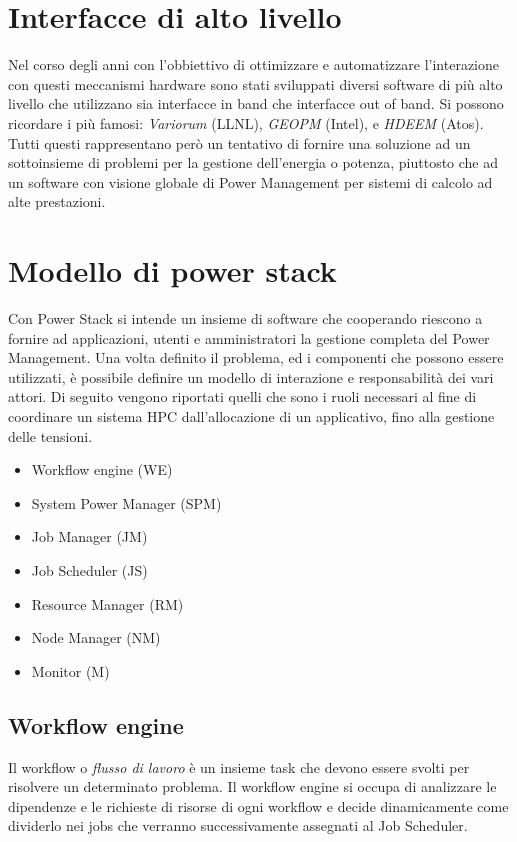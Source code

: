 \section{Interfacce di alto livello}
Nel corso degli anni con l'obbiettivo di ottimizzare e automatizzare l'interazione con questi meccanismi hardware sono stati sviluppati diversi software di più alto livello che utilizzano sia interfacce in band che interfacce out of band. Si possono ricordare i più famosi: \emph{Variorum} (LLNL), \emph{GEOPM} (Intel)\cite{GEOPM}, e \emph{HDEEM} (Atos)\cite{HDEEM}. Tutti questi rappresentano però un tentativo di fornire una soluzione ad un sottoinsieme di problemi per la gestione dell'energia o potenza, piuttosto che ad un software con visione globale di Power Management per sistemi di calcolo ad alte prestazioni. %


\section{Modello di power stack} %
Con Power Stack si intende un insieme di software che cooperando riescono a fornire ad applicazioni, utenti e amministratori la gestione completa del Power Management. Una volta definito il problema, ed i componenti che possono essere utilizzati, è possibile definire un modello di interazione e responsabilità dei vari attori. Di seguito vengono riportati quelli che sono i ruoli necessari al fine di coordinare un sistema HPC dall'allocazione di un applicativo, fino alla gestione delle tensioni. 
\begin{itemize}
    \item Workflow engine (WE)
    \item System Power Manager (SPM)
    \item Job Manager (JM)
    \item Job Scheduler (JS)
    \item Resource Manager (RM)
    \item Node Manager (NM)
    \item Monitor (M)
\end{itemize}

\subsection{Workflow engine}
Il workflow o \emph{flusso di lavoro} è un insieme task che devono essere svolti per risolvere un determinato problema. Il workflow engine si occupa di analizzare le dipendenze e le richieste di risorse di ogni workflow e decide dinamicamente come dividerlo nei jobs che verranno successivamente assegnati al Job Scheduler. %

